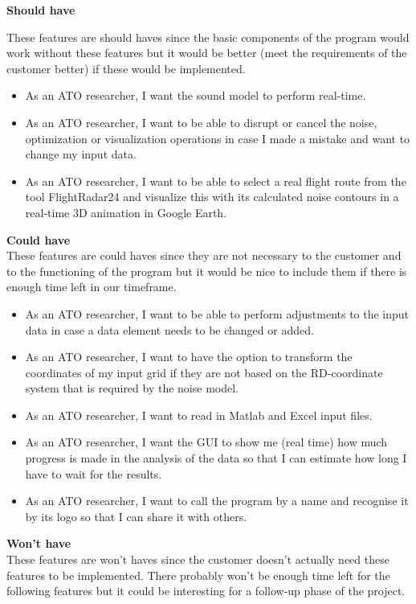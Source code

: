 ﻿\documentclass[a4paper,english,fleqn]{exam}
\begin{document}
\newpage

\textbf{Should have}

These features are should haves since the basic components of the program would work without these features but it would be better (meet the requirements of the customer better) if these would be implemented. 

\begin{itemize}
\item As an ATO researcher, I want the sound model to perform real-time.
\item As an ATO researcher, I want to be able to disrupt or cancel the noise, optimization or visualization operations in case I made a mistake and want to change my input data.
\item As an ATO researcher, I want to be able to select a real flight route from the tool FlightRadar24 and visualize this with its calculated noise contours in a real-time 3D animation in Google Earth.
\end{itemize}

\textbf{Could have} \\
These features are could haves since they are not necessary to the customer and to the functioning of the program but it would be nice to include them if there is enough time left in our timeframe. 

\begin{itemize}
\item As an ATO researcher, I want to be able to perform adjustments to the input data in case a data element needs to be changed or added. 
\item As an ATO researcher, I want to have the option to transform the coordinates of my input grid if they are not based on the RD-coordinate system that is required by the noise model.
\item As an ATO researcher, I want to read in Matlab and Excel input files.
\item As an ATO researcher, I want the GUI to show me (real time) how much progress is made in the analysis of the data so that I can estimate how long I have to wait for the results.
\item As an ATO researcher, I want to call the program by a name and recognise it by its logo so that I can share it with others.
\end{itemize}

\textbf{Won't have} \\
These features are won't haves since the customer doesn't actually need these features to be implemented. There probably won't be enough time left for the following features but it could be interesting for a follow-up phase of the project. 
\end{document}
